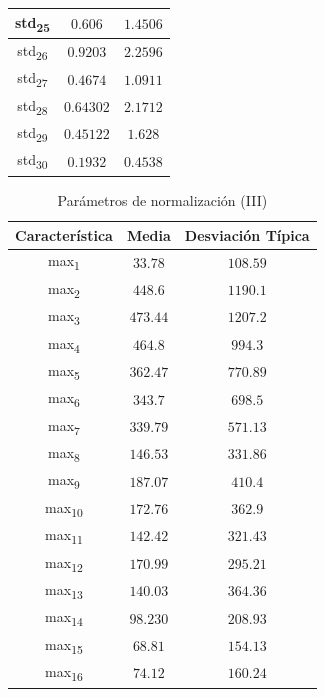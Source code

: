 \documentclass[12pt]{article}
\begin{document}
\begin{table}
\begin{tabular}{||c c c||}
			\hline
			std\textsubscript{25} & $0.606$ & $1.4506$ \\
			\hline
			std\textsubscript{26} & $0.9203$ & $2.2596$ \\
			\hline
			std\textsubscript{27} & $0.4674$ & $1.0911$ \\
			\hline
			std\textsubscript{28} & $0.64302$ & $2.1712$ \\
			\hline
			std\textsubscript{29} & $0.45122$ & $1.628$ \\
			\hline
			std\textsubscript{30} & $0.1932$ & $0.4538$ \\
			\hline
		\end{tabular}
	\label{Tab:Features_3_2}
\end{table}

\begin{table}
	\caption{Parámetros de normalización (III)}
	\centering
		\begin{tabular}{||c c c||}
			\hline
			Característica & Media & Desviación Típica  \\ [0.5ex]
			\hline\hline
			max\textsubscript{1} & $33.78$ & $108.59$ \\
			\hline
			max\textsubscript{2} & $448.6$ & $1190.1$ \\
			\hline
			max\textsubscript{3} & $473.44$ & $1207.2$ \\
			\hline
			max\textsubscript{4} & $464.8$ & $994.3$ \\
			\hline
			max\textsubscript{5} & $362.47$ & $770.89$ \\
			\hline
			max\textsubscript{6} & $343.7$ & $698.5$ \\
			\hline
			max\textsubscript{7} & $339.79$ & $571.13$ \\
			\hline
			max\textsubscript{8} & $146.53$ & $331.86$ \\
			\hline
			max\textsubscript{9} & $187.07$ & $410.4$ \\
			\hline
			max\textsubscript{10} & $172.76$ & $362.9$ \\
			\hline
			max\textsubscript{11} & $142.42$ & $321.43$ \\
			\hline
			max\textsubscript{12} & $170.99$ & $295.21$ \\
			\hline
			max\textsubscript{13} & $140.03$ & $364.36$ \\
			\hline
			max\textsubscript{14} & $98.230$ & $208.93$ \\
			\hline
			max\textsubscript{15} & $68.81$ & $154.13$ \\
			\hline
			max\textsubscript{16} & $74.12$ & $160.24$ \\

\end{tabular}
\end{table}
\end{document}
